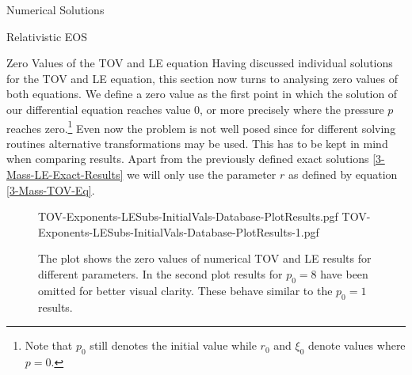 \begin{section}{Numerical Solutions}
\begin{subsection}{Relativistic EOS}
\end{subsection}
%
%
\begin{subsection}{Zero Values of the TOV and LE equation}
Having discussed individual solutions for the TOV and LE equation, this section now turns to analysing zero values of both equations.
We define a zero value as the first point in which the solution of our differential equation reaches value $0$, or more precisely where the pressure $p$ reaches zero.\footnote{Note that $p_0$ still denotes the initial value while $r_0$ and $\xi_0$ denote values where $p=0$.}
Even now the problem is not well posed since for different solving routines alternative transformations may be used.
This has to be kept in mind when comparing results. 
Apart from the previously defined exact solutions \ref{3-Mass-LE-Exact-Results} we will only use the parameter $r$ as defined by equation \ref{3-Mass-TOV-Eq}.
\begin{figure}[H]
	\centering
	{TOV-Exponents-LESubs-InitialVals-Database-PlotResults.pgf}
	{TOV-Exponents-LESubs-InitialVals-Database-PlotResults-1.pgf}
	\label{4-NumSol-TOV-Exponents-Const-p0}
	\caption[Zero Values of TOV and LE equation]{The plot shows the zero values of numerical TOV and LE results for different parameters. 
	In the second plot results for $p_0=8$ have been omitted for better visual clarity. These behave similar to the $p_0=1$ results.}
\end{figure}


\end{subsection}
%
%
\end{section}
